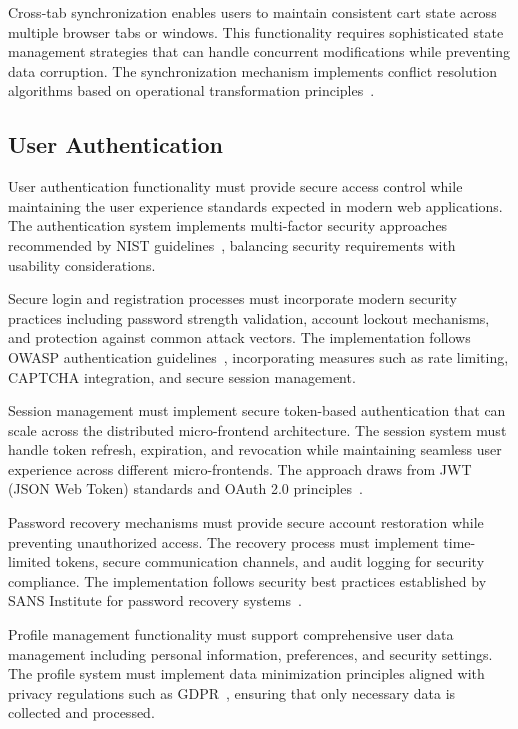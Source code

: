 \documentclass[12pt,a4paper]{report}
\begin{document}
Cross-tab synchronization enables users to maintain consistent cart state across multiple browser tabs or windows. This functionality requires sophisticated state management strategies that can handle concurrent modifications while preventing data corruption. The synchronization mechanism implements conflict resolution algorithms based on operational transformation principles~\cite{ellis1989operational}.

\subsection{User Authentication}

User authentication functionality must provide secure access control while maintaining the user experience standards expected in modern web applications. The authentication system implements multi-factor security approaches recommended by NIST guidelines~\cite{nist2017digital}, balancing security requirements with usability considerations.

Secure login and registration processes must incorporate modern security practices including password strength validation, account lockout mechanisms, and protection against common attack vectors. The implementation follows OWASP authentication guidelines~\cite{owasp2021authentication}, incorporating measures such as rate limiting, CAPTCHA integration, and secure session management.

Session management must implement secure token-based authentication that can scale across the distributed micro-frontend architecture. The session system must handle token refresh, expiration, and revocation while maintaining seamless user experience across different micro-frontends. The approach draws from JWT (JSON Web Token) standards and OAuth 2.0 principles~\cite{jones2015oauth}.

Password recovery mechanisms must provide secure account restoration while preventing unauthorized access. The recovery process must implement time-limited tokens, secure communication channels, and audit logging for security compliance. The implementation follows security best practices established by SANS Institute for password recovery systems~\cite{sans2021password}.

Profile management functionality must support comprehensive user data management including personal information, preferences, and security settings. The profile system must implement data minimization principles aligned with privacy regulations such as GDPR~\cite{eu2016gdpr}, ensuring that only necessary data is collected and processed.
\end{document}
